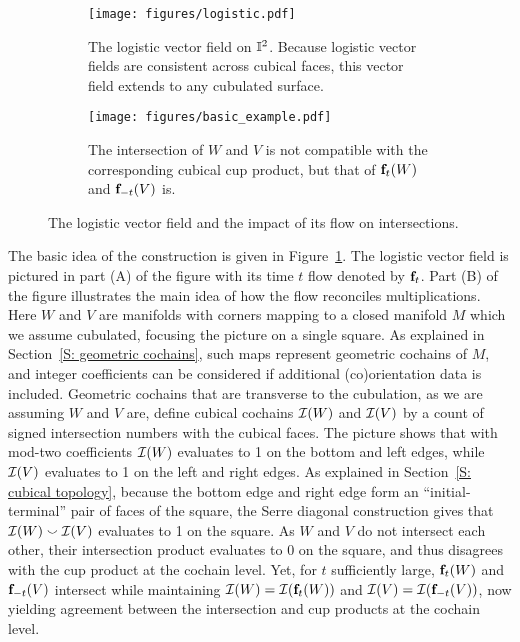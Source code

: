 \begin{figure}[h] 
	\centering
	\hfill
	\begin{subfigure}[b]{0.45\textwidth}
		\texttt{[image: figures/logistic.pdf]}
		\caption{The logistic vector field on $\mathbb{I}^2$. 
			Because logistic vector fields are consistent across cubical faces, this vector field extends to any cubulated surface.}
	\end{subfigure}
	\hspace{0.2 in}
	\begin{subfigure}[b]{0.45\textwidth}
		\texttt{[image: figures/basic\_example.pdf]}
		\caption{The intersection of $W$ and $V$ is not compatible with the corresponding cubical cup product, but that of $\mathbf{f}_t(W)$ and $\mathbf{f}_{-t}(V)$ is.}
	\end{subfigure}
	\caption{The logistic vector field and the impact of its flow on intersections.}
	\label{F: logistic}
\end{figure}

The basic idea of the construction is given in Figure~\ref{F: logistic}. The logistic vector field is pictured in part (A) of the figure with its time $t$ flow denoted by 
$\mathbf{f}_t$.  Part (B) of the figure illustrates the main idea of how the flow reconciles multiplications.
Here $W$ and $V$ are manifolds with corners mapping to a closed manifold $M$ which we assume cubulated, focusing the picture on a single square.
As explained in Section~\ref{S: geometric cochains}, such maps represent geometric cochains of $M$, and integer coefficients can be considered if additional (co)orientation data is included.
Geometric cochains that are transverse to the cubulation, as we are assuming $W$ and $V$ are, define cubical cochains $\mathcal{I}(W)$ and $\mathcal{I}(V)$ by a count of signed intersection numbers with the cubical faces.
The picture shows that with mod-two coefficients $\mathcal{I}(W)$ evaluates to 1 on the bottom and left edges, while $\mathcal{I}(V)$ evaluates to 1 on the left and right edges.
As explained in Section~\ref{S: cubical topology}, because the bottom edge and right edge form an ``initial-terminal'' pair of faces of the square, the Serre diagonal construction gives that $\mathcal{I}(W) \smallsmile \mathcal{I}(V)$ evaluates to 1 on the square.
As $W$ and $V$ do not intersect each other, their intersection product evaluates to 0 on the square, and thus disagrees with the cup product at the cochain level.
Yet, for $t$ sufficiently large, $\mathbf{f}_t(W)$ and $\mathbf{f}_{-t}(V)$ intersect while maintaining $\mathcal{I}(W) = \mathcal{I}(\mathbf{f}_t(W))$ and $\mathcal{I}(V) = \mathcal{I}(\mathbf{f}_{-t}(V))$, now yielding agreement between the intersection and cup products at the cochain level.


